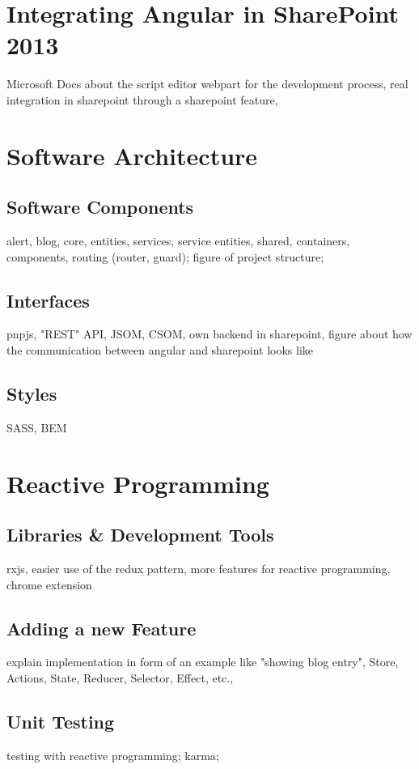\documentclass[Bachelor,BIF,english]{twbook}
\begin{document}
\section{Integrating Angular in SharePoint 2013}
Microsoft Docs about the script editor webpart for the development process, real integration in sharepoint through a sharepoint feature,

\section{Software Architecture}

\subsection{Software Components}
alert, blog, core, entities, services, service entities, shared, containers, components, routing (router, guard); figure of project structure;

\subsection{Interfaces}
pnpjs, "REST" API, JSOM, CSOM, own backend in sharepoint, figure about how the communication between angular and sharepoint looks like

\subsection{Styles}
SASS, BEM

\section{Reactive Programming}

\subsection{Libraries \& Development Tools}
rxjs, easier use of the redux pattern, more features for reactive programming, chrome extension

\subsection{Adding a new Feature}
explain implementation in form of an example like "showing blog entry", Store, Actions, State, Reducer, Selector, Effect, etc., 

\subsection{Unit Testing}
testing with reactive programming; karma;
\end{document}
